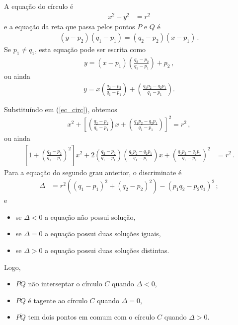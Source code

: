 A equação do círculo é
\begin{align}
    x^2 + y^2 &= r^2
    \label{ec_circ}
\end{align}
e a equação da reta que passa pelos pontos $P$ e $Q$ é
\begin{align*}
    (y-p_2)(q_1-p_1)=(q_2-p_2)(x-p_1)\,.
\end{align*}
Se $p_1\neq q_1$, esta equação pode ser escrita como
\begin{align*}
    y=(x-p_1)\left(\frac{q_2-p_2}{q_1-p_1}\right)+p_2\,,
\end{align*}
ou ainda
\begin{align*}
    y = x\left( \frac{q_2 - p_2}{q_1 - p_1} \right) + \left(
    \frac{q_1 p_2 - q_2 p_1}{q_1 - p_1} \right).
\end{align*}

Substituíndo em (\ref{ec_circ}), obtemos
\begin{align*}
    x^2  + \left[ \left( \frac{q_2 - p_2}{q_1 - p_1} \right) x + \left(
    \frac{q_1 p_2 - q_2 p_1}{q_1 - p_1} \right) \right]^2  = r^2\,,
\end{align*}
ou ainda
\begin{align*}
    \left[ 1 + \left( \frac{q_2 - p_2}{q_1 - p_1} \right)^2 \right] x^2 +
    2 \left( \frac{q_2 - p_2}{q_1 - p_1} \right) \left( \frac{q_1 p_2 - q_2
    p_1}{q_1 - p_1} \right) x + \left( 
    \frac{q_1 p_2 - q_2 p_1}{q_1 - p_1} \right)^2 & = r^2\,.
\end{align*}
Para a equação do segundo grau anterior, o discriminate é
\begin{align*}
    \Delta &= r^2 \left( \left( q_1 - p_1 \right)^2 + \left( q_2 - p_2
    \right)^2 \right) - \left( p_1 q_2 - p_2 q_1 \right)^2\,;
\end{align*}
e
\begin{itemize}
    \item se $\Delta < 0$ a equação não possui solução,
    \item se $\Delta = 0$ a equação possui duas soluções iguais,
    \item se $\Delta > 0$ a equação possui duas soluções distintas.
\end{itemize}
Logo,
\begin{itemize}
    \item $\overline{PQ}$ não interseptar o círculo $C$ quando $\Delta < 0$,
    \item $\overline{PQ}$ é tagente ao círculo $C$ quando $\Delta = 0$,
    \item $\overline{PQ}$ tem dois pontos em comum com o círculo $C$ quando
        $\Delta > 0$.
\end{itemize}
